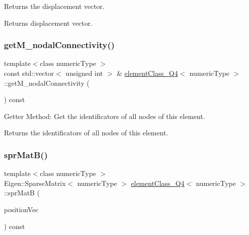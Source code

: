 Returns the displacement vector. \begin{DoxyReturn}{Returns}
displacement vector. 
\end{DoxyReturn}
\mbox{\label{classelement_class___q4_abe3f00cce16a360c1810f50f56fff445}} 
\subsubsection{\texorpdfstring{get\+M\+\_\+nodal\+Connectivity()}{getM\_nodalConnectivity()}}
{\footnotesize\ttfamily template$<$class numeric\+Type $>$ \\
const std\+::vector$<$ unsigned int $>$ \& \mbox{\hyperlink{classelement_class___q4}{element\+Class\+\_\+\+Q4}}$<$ numeric\+Type $>$\+::get\+M\+\_\+nodal\+Connectivity (\begin{DoxyParamCaption}{ }\end{DoxyParamCaption}) const}

Getter Method\+: Get the identificators of all nodes of this element. \begin{DoxyReturn}{Returns}
the identificators of all nodes of this element. 
\end{DoxyReturn}
\mbox{\label{classelement_class___q4_a7503f92c139700e19433c2843496b670}} 
\subsubsection{\texorpdfstring{spr\+Mat\+B()}{sprMatB()}}
{\footnotesize\ttfamily template$<$class numeric\+Type $>$ \\
Eigen\+::\+Sparse\+Matrix$<$ numeric\+Type $>$ \mbox{\hyperlink{classelement_class___q4}{element\+Class\+\_\+\+Q4}}$<$ numeric\+Type $>$\+::spr\+MatB (\begin{DoxyParamCaption}\item[{const Matrix$<$ numeric\+Type, 2, 1 $>$ \&}]{position\+Vec }\end{DoxyParamCaption}) const}

